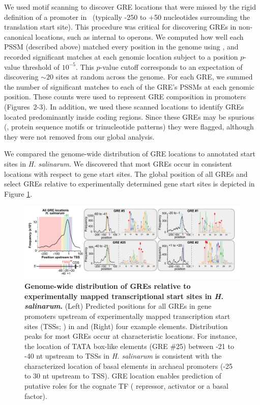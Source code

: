 We used motif scanning to discover GRE locations that were missed by
the rigid definition of a promoter in \cm\ (typically -250 to +50
nucleotides surrounding the translation start site). This procedure
was critical for discovering GREs in non-canonical locations, such as
internal to operons. We computed how well each PSSM (described above)
matched every position in the genome
using  \cite{Bailey1998}, and recorded significant
matches at each genomic location subject to a position $p$-value
threshold of $10^{-5}$. This $p$-value cutoff corresponds to an
expectation of discovering $\sim 20$ sites at random across the
genome. For each GRE, we summed the number of significant matches to
each of the GRE’s PSSMs at each genomic position. These counts were
used to represent GRE composition in promoters (Figures~2-3). In
addition, we used these scanned locations to identify GREs located
predominantly inside coding regions. Since these GREs may be spurious
(\eg, protein sequence motifs or trinucleotide patterns) they were
flagged, although they were not removed from our global analysis.

We compared the genome-wide distribution of GRE locations to annotated
start sites in \textit{H. salinarum}.  We discovered that most GREs
occur in consistent locations with respect to gene start sites.  The
global position of all GREs and select GREs relative to experimentally
determined gene start sites is depicted in
Figure \ref{fig:gre_global_locs_hal}.

\begin{figure}[h!]
\centering
\includegraphics[width=0.95\linewidth]{figures/gre_global_locs_hal.pdf}
\caption[Genome-wide distribution of GREs relative to experimentally mapped 
transcriptional start sites in \textit{H. salinarum}]{
\textbf{Genome-wide distribution of GREs relative to experimentally 
mapped transcriptional start sites in \textit{H. salinarum}.}  (Left)
Predicted positions for all GREs in gene promoters upstream of
experimentally mapped transcription start sites
(TSSs; \cite{Koide2009}) in and (Right) four example
elements. Distribution peaks for most GREs occur at characteristic
locations. For instance, the location of TATA box-like elements
(GRE \#25) between -21 to -40 nt upstream to TSSs in {\it
H. salinarum} is consistent with the characterized location of basal
elements in archaeal promoters (-25 to 30 nt upstream to TSS). GRE
location enables prediction of putative roles for the cognate TF (\eg
repressor, activator or a basal factor).}
\label{fig:gre_global_locs_hal}
\end{figure}

